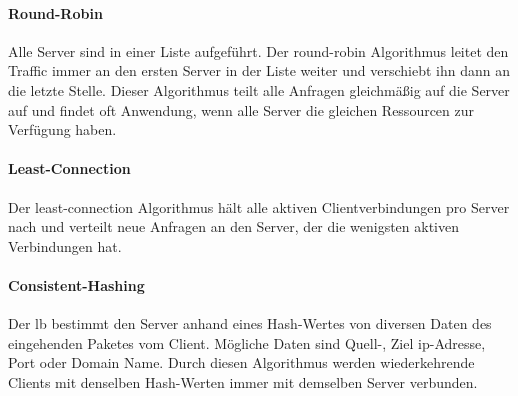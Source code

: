 \paragraph{Round-Robin}
Alle Server sind in einer Liste aufgeführt. Der round-robin Algorithmus leitet den Traffic immer an den ersten Server in der Liste weiter und verschiebt ihn dann an die letzte Stelle.
Dieser Algorithmus teilt alle Anfragen gleichmä{\ss}ig auf die Server auf und findet oft Anwendung, wenn alle Server die gleichen Ressourcen zur Verfügung haben.
\cite{WhatLoadBalancer}

\paragraph{Least-Connection}
Der least-connection Algorithmus hält alle aktiven Clientverbindungen pro Server nach und verteilt neue Anfragen an den Server, der die wenigsten aktiven Verbindungen hat.
\cite{WhatLoadBalancer}

\paragraph{Consistent-Hashing}
Der \ac{lb} bestimmt den Server anhand eines Hash-Wertes von diversen Daten des eingehenden Paketes vom Client.
Mögliche Daten sind Quell-, Ziel \ac{ip}-Adresse, Port oder Domain Name. Durch diesen Algorithmus werden wiederkehrende Clients mit denselben Hash-Werten immer mit demselben Server verbunden.
\cite{WhatLoadBalancer}

\newpage
